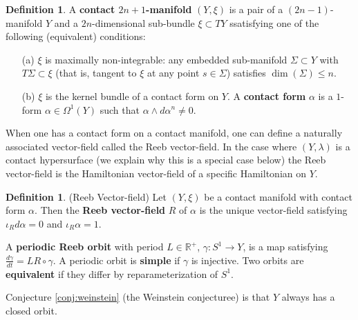 \documentclass[12pt]{article}
\theoremstyle{definition}
\newtheorem{definition}[theorem]{Definition}
\numberwithin{equation}{section}
\newcommand{\R}{{\mathbb R}}
\newcommand{\op}{\operatorname}
\begin{document}
\begin{definition} \label{def:contact_manifold} A {\bf contact $2n+1$-manifold} $(Y,\xi)$ is a pair of a $(2n-1)$-manifold $Y$ and a $2n$-dimensional sub-bundle $\xi \subset TY$ ssatisfying one of the following (equivalent) conditions:
\begin{itemize}
	\item[(a)] $\xi$ is maximally non-integrable: any embedded sub-manifold $\Sigma \subset Y$ with $T\Sigma \subset \xi$ (that is, tangent to $\xi$ at any point $s \in \Sigma$) satisfies $\op{dim}(\Sigma) \le n$.
	\item[(b)] $\xi$ is the kernel bundle of a contact form on $Y$. A {\bf contact form} $\alpha$ is a $1$-form $\alpha \in \Omega^1(Y)$ such that $\alpha \wedge d\alpha^n \neq 0$.
\end{itemize}
\end{definition}

When one has a contact form on a contact manifold, one can define a naturally associated vector-field called the Reeb vector-field. In the case where $(Y,\lambda)$ is a contact hypersurface (we explain why this is a special case below) the Reeb vector-field is the Hamiltonian vector-field of a specific Hamiltonian on $Y$.

\begin{definition} \label{def:reeb_vector_field} (Reeb Vector-field) Let $(Y,\xi)$ be a contact manifold with contact form $\alpha$. Then the {\bf Reeb vector-field} $R$ of $\alpha$ is the unique vector-field satisfying $\iota_Rd\alpha = 0$ and $\iota_R \alpha = 1$. 

A {\bf periodic Reeb orbit} with period $L \in \R^+$, $\gamma:S^1 \to Y$, is a map satisfying $\frac{d\gamma}{dt} = LR \circ \gamma$. A periodic orbit is {\bf simple} if $\gamma$ is injective. Two orbits are {\bf equivalent} if they differ by reparameterization of $S^1$.
\end{definition} 

Conjecture \ref{conj:weinstein} (the Weinstein conjecturee) is that $Y$ always has a closed orbit.
\end{document}
